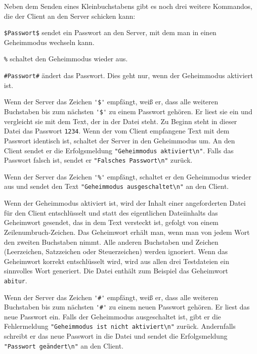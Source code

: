 Neben dem Senden eines Kleinbuchstabens gibt es noch drei weitere Kommandos,
die der Client an den Server schicken kann:

\begin{compactitem}
\item \lstinline|$Passwort$| sendet ein Passwort an den Server, mit dem man in
einen Geheimmodus wechseln kann.

\item \lstinline|%| schaltet den Geheimmodus wieder aus.

\item \lstinline|#Passwort#| ändert das Passwort. Dies geht nur, wenn der
Geheimmodus aktiviert ist.
\end{compactitem}

Wenn der Server das Zeichen \lstinline|'$'| empfängt, weiß er, dass alle
weiteren Buchstaben bis zum nächsten \lstinline|'$'| zu einem Passwort
gehören. Er liest sie ein und vergleicht sie mit dem Text, der in der Datei
 steht. Zu Beginn steht in dieser Datei das Passwort
\glqq\lstinline|1234|\grqq . Wenn der vom Client empfangene Text mit dem Passwort
identisch ist, schaltet der Server in den Geheimmodus um. An den Client sendet
er die Erfolgsmeldung \lstinline|"Geheimmodus aktiviert\n"|. Falls das Passwort
falsch ist, sendet er \lstinline|"Falsches Passwort\n"| zurück.

Wenn der Server das Zeichen \lstinline|'%'| empfängt, schaltet er den
Geheimmodus wieder aus und sendet den Text 
\lstinline|"Geheimmodus ausgeschaltet\n"| an den Client.

Wenn der Geheimmodus aktiviert ist, wird der Inhalt einer angeforderten Datei
für den Client entschlüsselt und statt des eigentlichen Dateiinhalts das
Geheimwort gesendet, das in dem Text versteckt ist, gefolgt von einem
Zeilenumbruch-Zeichen. Das Geheimwort erhält man, wenn man von jedem Wort den
zweiten Buchstaben nimmt. Alle anderen Buchstaben und Zeichen (Leerzeichen,
Satzzeichen oder Steuerzeichen) werden ignoriert. Wenn das Geheimwort korrekt
entschlüsselt wird, wird aus allen drei Testdateien ein sinnvolles Wort
generiert. Die Datei  enthält zum Beispiel das Geheimwort
\lstinline|abitur|.

Wenn der Server das Zeichen \lstinline|'#'| empfängt, weiß er, dass alle
weiteren Buchstaben bis zum nächsten \lstinline|'#'| zu einem neuen Passwort
gehören. Er liest das neue Passwort ein. Falls der Geheimmodus ausgeschaltet
ist, gibt er die Fehlermeldung \lstinline|"Geheimmodus ist nicht aktiviert\n"|
zurück. Andernfalls schreibt er das neue Passwort in die Datei
 und sendet die Erfolgsmeldung 
\lstinline|"Passwort geändert\n"| an den Client.

